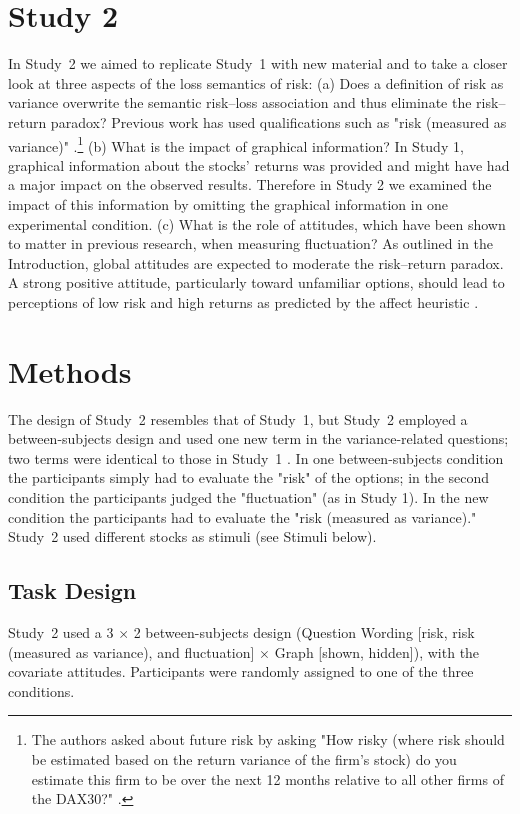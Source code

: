 \documentclass[a4paper,man, natbib,floatsintext]{apa6} %
\begin{document}
\section{Study 2}
 In Study~2 we aimed to replicate Study~1 with new material and to take a closer look at three aspects of the loss semantics of risk: (a) Does a definition of risk as variance overwrite the semantic risk--loss association and thus eliminate the risk--return paradox? Previous work has used qualifications such as "risk (measured as variance)" \citep[e.g.,][]{Kempf2014a}.\footnote{The authors asked about future risk by asking "How risky (where risk should be estimated based on the return variance of the firm’s stock) do you estimate this firm to be over the next 12 months relative to all other firms of the DAX30?" \citep[][p. 1007]{Kempf2014}.} (b) What is the impact of graphical information? In Study 1, graphical information about the stocks' returns was provided and might have had a major impact on the observed results. Therefore in Study 2 we examined the impact of this information by omitting the graphical information in one experimental condition. (c) What is the role of attitudes, which have been shown to matter in previous research, when measuring fluctuation? As outlined in the Introduction, global attitudes are expected to moderate the risk--return paradox. A strong positive attitude, particularly toward unfamiliar options, should lead to perceptions of low risk and high returns as predicted by the affect heuristic \citep[][]{Finucane2000}.

\section{Methods}
The design of Study~2 resembles that of Study~1, but Study~2 employed a between-subjects design and used one new term in the variance-related questions; two terms were identical to those in Study~1 . In one between-subjects condition the participants simply had to evaluate the "risk" of the options; in the second condition the participants judged the "fluctuation" (as in Study 1). In the new condition the participants had to evaluate the "risk (measured as variance)." Study~2 used different stocks as stimuli (see Stimuli below).

\subsection{Task Design}
Study~2 used a 3 $\times$ 2 between-subjects design (Question Wording [risk, risk (measured as variance), and fluctuation] $\times$ Graph [shown, hidden]), with the covariate attitudes. Participants were randomly assigned to one of the three conditions.
\end{document}
